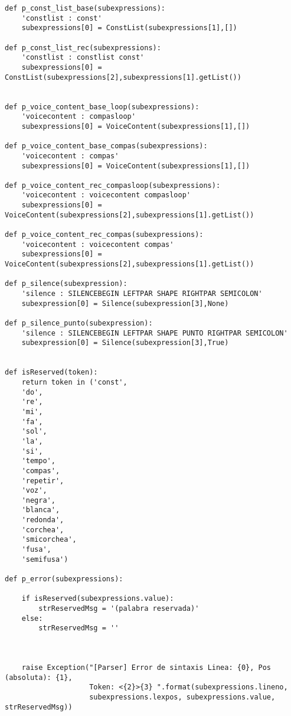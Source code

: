 \begin{verbatim}
def p_const_list_base(subexpressions):
    'constlist : const'
    subexpressions[0] = ConstList(subexpressions[1],[])

def p_const_list_rec(subexpressions):
    'constlist : constlist const'
    subexpressions[0] = ConstList(subexpressions[2],subexpressions[1].getList())


def p_voice_content_base_loop(subexpressions):
    'voicecontent : compasloop'
    subexpressions[0] = VoiceContent(subexpressions[1],[])

def p_voice_content_base_compas(subexpressions):
    'voicecontent : compas'
    subexpressions[0] = VoiceContent(subexpressions[1],[])

def p_voice_content_rec_compasloop(subexpressions):
    'voicecontent : voicecontent compasloop'
    subexpressions[0] = VoiceContent(subexpressions[2],subexpressions[1].getList())

def p_voice_content_rec_compas(subexpressions):
    'voicecontent : voicecontent compas'
    subexpressions[0] = VoiceContent(subexpressions[2],subexpressions[1].getList())

def p_silence(subexpression):
    'silence : SILENCEBEGIN LEFTPAR SHAPE RIGHTPAR SEMICOLON'
    subexpression[0] = Silence(subexpression[3],None)

def p_silence_punto(subexpression):
    'silence : SILENCEBEGIN LEFTPAR SHAPE PUNTO RIGHTPAR SEMICOLON'
    subexpression[0] = Silence(subexpression[3],True)


def isReserved(token):
    return token in ('const',
    'do',
    're',
    'mi',
    'fa',
    'sol',
    'la',
    'si',
    'tempo',
    'compas',
    'repetir',
    'voz',
    'negra',
    'blanca',
    'redonda',
    'corchea',
    'smicorchea',
    'fusa',
    'semifusa')

def p_error(subexpressions):

    if isReserved(subexpressions.value):
        strReservedMsg = '(palabra reservada)'
    else:
        strReservedMsg = ''



    raise Exception("[Parser] Error de sintaxis Linea: {0}, Pos (absoluta): {1},
                    Token: <{2}>{3} ".format(subexpressions.lineno,
                    subexpressions.lexpos, subexpressions.value, strReservedMsg))
\end{verbatim}